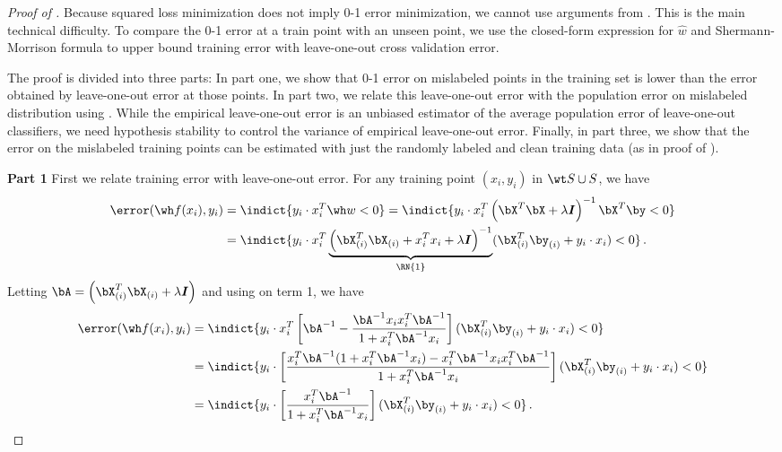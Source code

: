 \begin{proof}[Proof of ]
    Because squared loss minimization does not imply 0-1 error minimization, 
    we cannot use arguments from . 
    This is the main technical difficulty. 
    To compare the 0-1 error at a train point with an unseen point, 
    we use the closed-form expression for $\widehat{w}$ 
    and Shermann-Morrison formula 
    to upper bound training error 
    with leave-one-out cross validation error. 
    
    The proof is divided into three parts: 
    In part one, we show that 0-1 error 
    on mislabeled points in the training set 
    is lower than the error obtained 
    by leave-one-out error at those points. 
    In part two, we relate this leave-one-out error 
    with the population error on mislabeled distribution
    using .
    While the empirical leave-one-out error is an unbiased estimator 
    of the average population error of leave-one-out classifiers, 
    we need hypothesis stability 
    to control the variance 
    of empirical leave-one-out error. 
    Finally, in part three, we show 
    that the error on the mislabeled training points 
    can be estimated with just the randomly labeled 
    and clean training data (as in proof of ).  

    \textbf{Part 1 {} {}} First we relate training error with leave-one-out error.        
    For any training point $(x_i, y_i)$ in $\wt S \cup S$, we have 
    \begin{align}
        \error(\wh f(x_i), y_i ) &= \indict{ y_i \cdot x_i^T \wh w < 0 } = \indict{ y_i \cdot x_i^T \left( \bX^T\bX+\lambda \boldsymbol{I}\right)^{-1}\bX^T\by < 0 } \\
        &= \indict{ y_i \cdot x_i^T \underbrace{\left( \bXX{i}^T\bXX{i} + x_i ^T x_i +\lambda \boldsymbol{I}\right)^{-1}}_{\RN{1}} (\bXX{i}^T\byy{i} + y_i \cdot x_i) < 0 } \,.
    \end{align}
    Letting $\bA = \left(\bXX{i}^T\bXX{i} +\lambda \boldsymbol{I}\right)$ 
    and using  on term 1, we have 
    \begin{align}
        \error(\wh f(x_i), y_i ) &= \indict{ y_i \cdot x_i^T \left[\bA^{-1} -  \frac{\bA^{-1} x_i x_i^T \bA^{-1}}{ 1 + x_i ^T \bA^{-1} x_i } \right] (\bXX{i}^T\byy{i} + y_i \cdot x_i) < 0 } \\
        &= \indict{ y_i \cdot\left[ \frac{ x_i^T \bA^{-1} ( 1 + x_i ^T \bA^{-1} x_i ) -  x_i^T \bA^{-1} x_i x_i^T \bA^{-1}}{ 1 + x_i ^T \bA ^{-1}x_i } \right] (\bXX{i}^T\byy{i} + y_i \cdot x_i) < 0 } \\
        &= \indict{ y_i \cdot\left[ \frac{ x_i^T \bA^{-1}}{ 1 + x_i ^T \bA ^{-1}x_i } \right] (\bXX{i}^T\byy{i} + y_i \cdot x_i) < 0 } \,.
    \end{align}


\end{proof}
